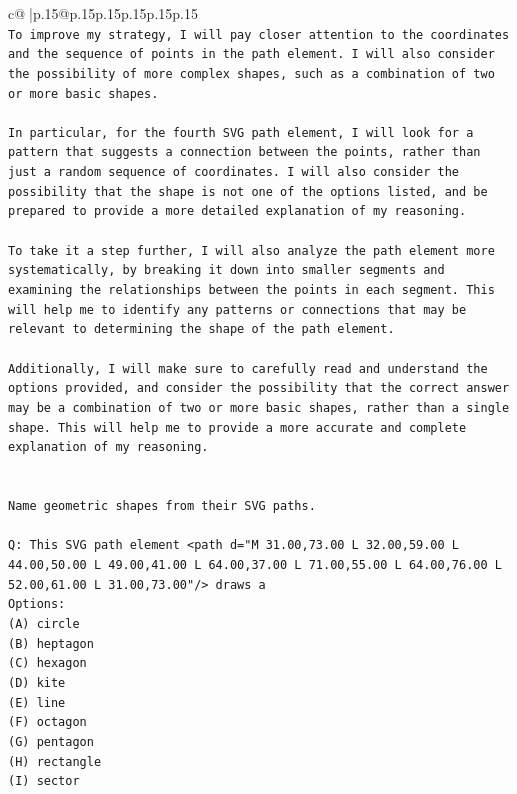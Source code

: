 \documentclass{article}
\begin{document}
{\begin{supertabular}{c@{$\;$}|p{.15\linewidth}@{}p{.15\linewidth}p{.15\linewidth}p{.15\linewidth}p{.15\linewidth}p{.15\linewidth}}
{{{\\ 
\texttt{To improve my strategy, I will pay closer attention to the coordinates and the sequence of points in the path element. I will also consider the possibility of more complex shapes, such as a combination of two or more basic shapes. } \\
\\ 
\texttt{In particular, for the fourth SVG path element, I will look for a pattern that suggests a connection between the points, rather than just a random sequence of coordinates. I will also consider the possibility that the shape is not one of the options listed, and be prepared to provide a more detailed explanation of my reasoning.} \\
\\ 
\texttt{To take it a step further, I will also analyze the path element more systematically, by breaking it down into smaller segments and examining the relationships between the points in each segment. This will help me to identify any patterns or connections that may be relevant to determining the shape of the path element.} \\
\\ 
\texttt{Additionally, I will make sure to carefully read and understand the options provided, and consider the possibility that the correct answer may be a combination of two or more basic shapes, rather than a single shape. This will help me to provide a more accurate and complete explanation of my reasoning.} \\
\\ 
\\ 
\texttt{Name geometric shapes from their SVG paths.} \\
\\ 
\texttt{Q: This SVG path element <path d="M 31.00,73.00 L 32.00,59.00 L 44.00,50.00 L 49.00,41.00 L 64.00,37.00 L 71.00,55.00 L 64.00,76.00 L 52.00,61.00 L 31.00,73.00"/> draws a} \\
\texttt{Options:} \\
\texttt{(A) circle} \\
\texttt{(B) heptagon} \\
\texttt{(C) hexagon} \\
\texttt{(D) kite} \\
\texttt{(E) line} \\
\texttt{(F) octagon} \\
\texttt{(G) pentagon} \\
\texttt{(H) rectangle} \\
\texttt{(I) sector} \\
}}}
\end{supertabular}}
\end{document}
